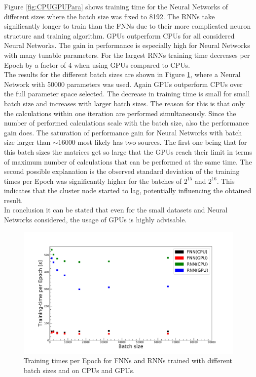 Figure \ref{fig:CPUGPUPara} shows training time for the Neural Networks of different sizes where the batch size was fixed to 8192. The RNNs take significantly longer to train than the FNNs due to their more complicated neuron structure and training algorithm. GPUs outperform CPUs for all considered Neural Networks. The gain in performance is especially high for Neural Networks with many tunable parameters. For the largest RNNs training time decreases per Epoch by a factor of 4 when using GPUs compared to CPUs. \\
The results for the different batch sizes are shown in Figure \ref{fig:CPUGPUBatch}, where a Neural Network with 50000 parameters was used. Again GPUs outperform CPUs over the full parameter space selected. The decrease in training time is small for small batch size and increases with larger batch sizes. The reason for this is that only the calculations within one iteration are performed simultaneously. Since the number of performed calculations scale with the batch size, also the performance gain does. The saturation of performance gain for Neural Networks with batch size larger than $\sim16000$ most likely has two sources. The first one being that for this batch sizes the matrices get so large that the GPUs reach their limit in terms of maximum number of calculations that can be performed at the same time. The second possible explanation is the observed standard deviation of the training times per Epoch was significantly higher for the batches of $2^{15}$ and $2^{16}$. This indicates that the cluster node started to lag, potentially influencing the obtained result. \\
In conclusion it can be stated that even for the small datasets and Neural Networks considered, the usage of GPUs is highly advisable.

\begin{figure}[H]
\centering
\includegraphics[width=\linewidth]{figs/CPUGPU/BatchTraintime_Fixed}
\caption{Training times per Epoch for FNNs and RNNs trained with different batch sizes and on CPUs and GPUs.}
\label{fig:CPUGPUBatch}
\end{figure}

